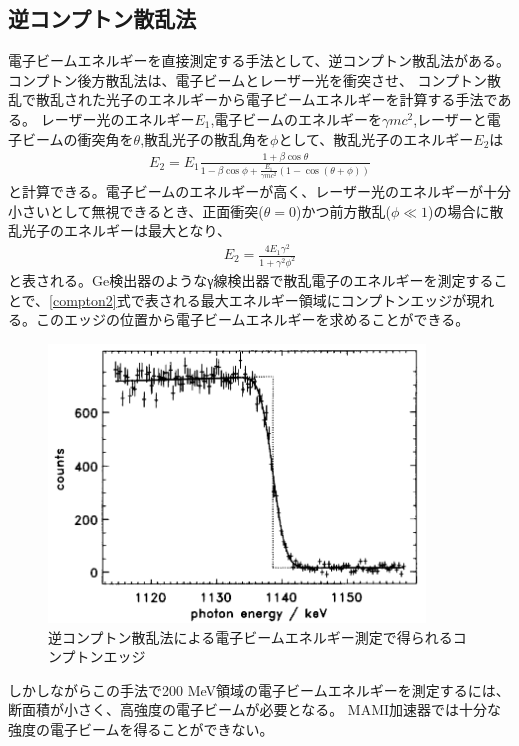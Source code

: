 \documentclass[a4paper,11pt,uplatex]{jsbook}
\begin{document}
\subsection{逆コンプトン散乱法}
電子ビームエネルギーを直接測定する手法として、逆コンプトン散乱法がある。コンプトン後方散乱法は、電子ビームとレーザー光を衝突させ、
コンプトン散乱で散乱された光子のエネルギーから電子ビームエネルギーを計算する手法である。
レーザー光のエネルギー$E_1$,電子ビームのエネルギーを$\gamma mc^2$,レーザーと電子ビームの衝突角を$\theta$,散乱光子の散乱角を$\phi$として、散乱光子のエネルギー$E_2$は
\begin{eqnarray}
  E_2 = E_1\frac{1+\beta\cos{\theta}}{1-\beta\cos{\phi} + \frac{E_1}{\gamma mc^2} (1-\cos{(\theta +\phi)})} \label{compton}
\end{eqnarray}
と計算できる。電子ビームのエネルギーが高く、レーザー光のエネルギーが十分小さいとして無視できるとき、正面衝突($\theta = 0$)かつ前方散乱($\phi \ll 1$)の場合に散乱光子のエネルギーは最大となり、
\begin{eqnarray}
  E_2 = \frac{4E_1\gamma^2}{1 + \gamma^2\phi^2} \label{compton2}
\end{eqnarray}
と表される。Ge検出器のようなγ線検出器で散乱電子のエネルギーを測定することで、\ref{compton2}式で表される最大エネルギー領域にコンプトンエッジが現れる。このエッジの位置から電子ビームエネルギーを求めることができる。
\begin{figure}
  \centering
  \includegraphics[width=10cm]{image/1-CBS.png}
  \caption[逆コンプトン散乱法]{逆コンプトン散乱法による電子ビームエネルギー測定で得られるコンプトンエッジ\cite{klein1997}}
\end{figure}
しかしながらこの手法で200 MeV領域の電子ビームエネルギーを測定するには、断面積が小さく、高強度の電子ビームが必要となる。%
MAMI加速器では十分な強度の電子ビームを得ることができない。
\end{document}
